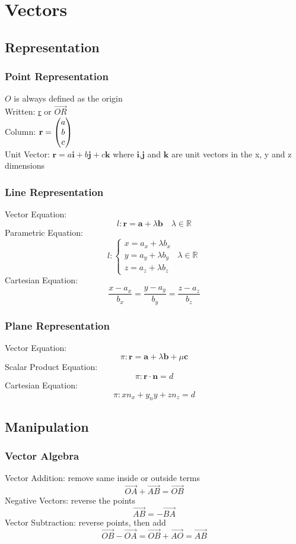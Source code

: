 \documentclass[../main]{subfiles}
\newcommand*\colvec[3][]{
    \begin{pmatrix}\ifx\relax#1\relax\else#1\\\fi#2\\#3\end{pmatrix}
}
\begin{document}
\section{Vectors}

\subsection{Representation}

	\subsubsection{Point Representation}
	\(O\) is always defined as the origin \\
	Written: \underline{r} or \( \overrightarrow{OR} \) \\
	Column: \( \mathbf{r} = \colvec[a]{b}{c} \) \\
	Unit Vector: \( \mathbf{r} = a\mathbf{i} + b\mathbf{j} + c\mathbf{k} \) where \(\mathbf{i}\),\(\mathbf{j}\) and \(\mathbf{k}\) are unit vectors in the x, y and z dimensions
	\subsubsection{Line Representation}
	Vector Equation:
	\[ l: \mathbf{r} = \mathbf{a} + \lambda \mathbf{b} \quad \lambda \in \mathbb{R} \]
	Parametric Equation:
	\begin{equation*}
		l:\begin{cases}
			x = a_x + \lambda b_x \\
			y = a_y + \lambda b_y \quad \lambda \in \mathbb{R} \\
			z = a_z + \lambda b_z 
		\end{cases}
	\end{equation*}
	Cartesian Equation:
	\[ \frac{x-a_x}{b_x} = \frac{y-a_y}{b_y} = \frac{z-a_z}{b_z} \]
	\subsubsection{Plane Representation}
	Vector Equation:
	\[ \pi : \mathbf{r} = \mathbf{a} + \lambda \mathbf{b} + \mu \mathbf{c} \]
	Scalar Product Equation:
	\[ \pi : \mathbf{r} \cdot \mathbf{n} = d \]
	Cartesian Equation:
	\[ \pi: xn_x + y_ny + zn_z = d \]

\subsection{Manipulation}

	\subsubsection{Vector Algebra}
	Vector Addition: remove same inside or outside terms
	\[ \overrightarrow{OA} + \overrightarrow{AB} = \overrightarrow{OB} \]
	Negative Vectors: reverse the points
	\[ \overrightarrow{AB} = -\overrightarrow{BA} \]
	Vector Subtraction: reverse points, then add
	\[ \overrightarrow{OB} - \overrightarrow{OA} = \overrightarrow{OB} + \overrightarrow{AO} = \overrightarrow{AB} \]
\end{document}
